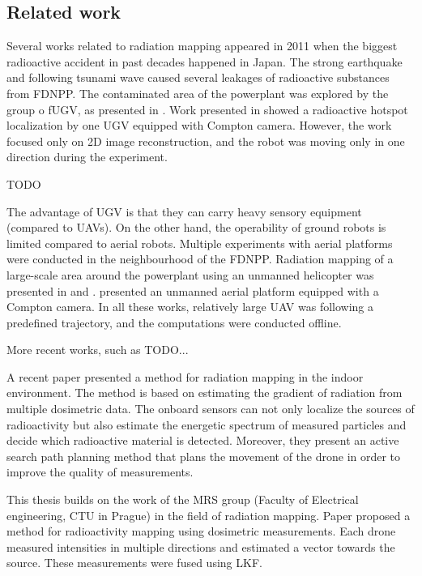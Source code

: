 \subsection{Related work}

Several works related to radiation mapping appeared in 2011 when the biggest radioactive accident in past decades happened in Japan.
The strong earthquake and following tsunami wave caused several leakages of radioactive substances from \ac{FDNPP}.
The contaminated area of the powerplant was explored by the group o f\ac{UGV}, as presented in \cite{fuku2012}.
Work presented in \cite{fuku_compton} showed a radioactive hotspot localization by one \ac{UGV} equipped with Compton camera.
However, the work focused only on 2D image reconstruction, and the robot was moving only in one direction during the experiment.

TODO

The advantage of \ac{UGV} is that they can carry heavy sensory equipment (compared to \ac{UAV}s).
On the other hand, the operability of ground robots is limited compared to aerial robots.
Multiple experiments with aerial platforms were conducted in the neighbourhood of the \ac{FDNPP}.
Radiation mapping of a large-scale area around the powerplant using an unmanned helicopter was presented in \cite{sanada2015} and \cite{towler2012}.
\cite{Jiang2015} presented an unmanned aerial platform equipped with a Compton camera. 
In all these works, relatively large \ac{UAV} was following a predefined trajectory, and the computations were conducted offline.

More recent works, such as TODO...


A recent paper \cite{mascarich2022} presented a method for radiation mapping in the indoor environment.
The method is based on estimating the gradient of radiation from multiple dosimetric data.
The onboard sensors can not only localize the sources of radioactivity but also estimate the energetic spectrum of measured particles and decide which radioactive material is detected.
Moreover, they present an active search path planning method that plans the movement of the drone in order to improve the quality of measurements.


This thesis builds on the work of the MRS group (Faculty of Electrical engineering, CTU in Prague) in the field of radiation mapping. 
Paper \cite{stibinger2020} proposed a method for radioactivity mapping using dosimetric measurements.
Each drone measured intensities in multiple directions and estimated a vector towards the source. 
These measurements were fused using \ac{LKF}.

